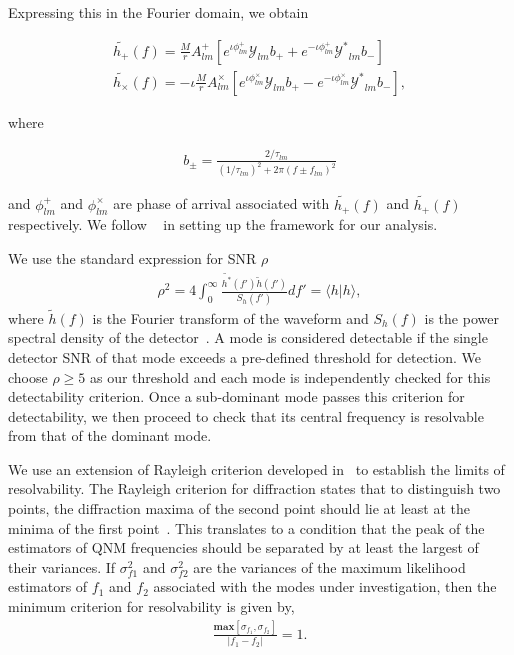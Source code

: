 Expressing this in the Fourier domain, we obtain

\begin{gather}
\tilde{h_{+}}(f)=\frac{M}{r} A^{+}_{lm}\left[e^{\iota \phi^{+}_{lm}} \mathcal{Y}_{lm} b_{+} + e^{- \iota \phi^{+}_{lm}} \mathcal{Y^{*}}_{lm} b_{-} \right]
\\ \tilde{h_{\times}}(f)=-\iota \frac{M}{r} A^{\times}_{lm}\left[e^{\iota \phi^{\times}_{lm}} \mathcal{Y}_{lm} b_{+} - e^{- \iota \phi^{\times}_{lm}} \mathcal{Y^{*}}_{lm} b_{-} \right],
\end{gather}

where

\begin{gather}
b_{\pm}=\frac{2/\tau_{lm}}{(1/\tau_{lm})^{2} + {2 \pi (f \pm f_{lm})^{2}}}
\end{gather}

and $\phi^{+}_{lm}$ and $\phi^{\times}_{lm}$ are phase of arrival associated with $\tilde{h_{+}}(f)$ and $\tilde{h_{+}}(f)$ respectively. We follow ~\cite{2006PhRvD..73f4030B} in setting up the framework for our analysis. 

We use the standard expression for SNR $\rho$
\begin{align}
\rho^{2}=4 \int_{0}^{\infty} \frac{\tilde{h^{*}}(f')\tilde{h}(f')}{S_{h}(f')} df' = \langle h|h\rangle,
\end{align}
where $\tilde{h}(f)$ is the Fourier transform of the waveform and $S_{h}(f)$ is the power spectral density of the detector~\cite{PhysRevD.49.2658}. A mode is considered detectable if the single detector SNR of that mode exceeds a pre-defined threshold for detection. We choose $\rho \geq 5$ as our threshold and each mode is independently checked for this detectability criterion. Once a sub-dominant mode passes this criterion for detectability, we then proceed to check that its central frequency is resolvable from that of the dominant mode. 

We use an extension of Rayleigh criterion developed in~\cite{PhysRevD.73.064030,1453789,1038162} to establish the limits of resolvability. The Rayleigh criterion for diffraction states that to distinguish two points, the diffraction maxima of the second point should lie at least at the minima of the first point~\cite{van2004detection}. This translates to a condition that the peak of the estimators of QNM frequencies should be separated by at least the largest of their variances. If $\sigma_{f1}^2$ and $\sigma_{f2}^2$ are the variances of the maximum likelihood estimators of $f_{1}$ and $f_{2}$ associated with the modes under investigation, then the minimum criterion for resolvability is given by,
\begin{align}
 \frac{\textbf{max} [\sigma_{f_{1}},\sigma_{f_{2}}]}{|f_{1}-f_{2}|}=1.
\end{align}

